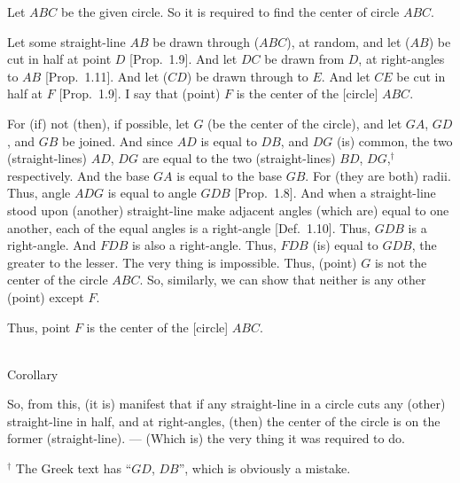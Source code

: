 \begin{Parallel}{}{}
{Let $ABC$ be the given circle. So it is required to find the center of circle $ABC$.

Let some straight-line $AB$ be drawn through ($ABC$), at random,
and let ($AB$) be cut in half at point $D$ 
[Prop.~1.9]. And let
$DC$ be drawn from $D$, at right-angles to $AB$ [Prop.~1.11].
And let ($CD$) be drawn through to $E$. And let $CE$ be cut in half
at $F$ [Prop.~1.9]. I say that (point) $F$ is the center of the [circle] $ABC$.

For (if) not (then), if possible, let $G$ (be the center of the circle), and
let $GA$, $GD$, and $GB$ be joined. And since $AD$ is equal to $DB$,
and $DG$ (is) common, the two (straight-lines) $AD$, $DG$
are equal to the two (straight-lines) $BD$, $DG$,$^\dag$ respectively. And the
base $GA$ is equal to the base $GB$. For (they are both) radii. Thus, angle
$ADG$ is equal to angle $GDB$ [Prop.~1.8]. And when a straight-line
stood upon (another) straight-line make  adjacent angles (which are)
equal to one another, each of the equal angles is a right-angle [Def.~1.10].
Thus, $GDB$ is a right-angle. And $FDB$ is also a right-angle. Thus,
$FDB$ (is) equal to $GDB$, the greater to the lesser. The very thing
is impossible. Thus, (point) $G$ is not the center of the circle $ABC$. 
So, similarly, we can show that neither is any other (point) except $F$.

\epsfysize=2.2in
\centerline{}

Thus, point $F$ is the center of the [circle] $ABC$.

\begin{center}\mbox{}\\
{\large Corollary}
\end{center}

So, from this, (it is) manifest that if any straight-line in a circle
cuts any (other) straight-line in half, and at right-angles, (then) the center
of the circle is on the former (straight-line). --- (Which is) the very thing it
was required to do.}
\end{Parallel}
{\footnotesize \noindent$^\dag$  The Greek text has ``$GD$, $DB$'', which is obviously a mistake.} 

